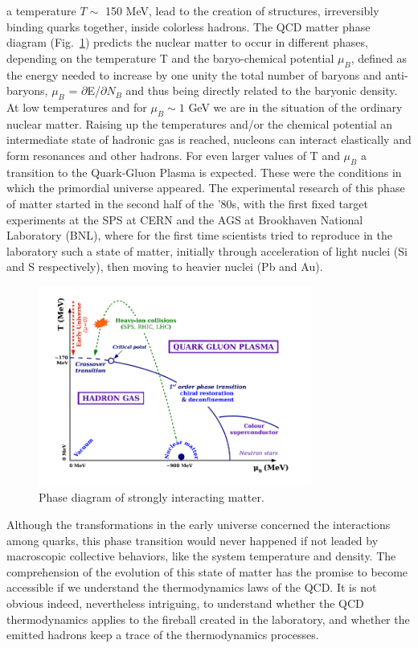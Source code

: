 a temperature $T \sim$ 150 MeV, lead to the 
creation of structures, irreversibly binding quarks together, inside colorless
hadrons. The QCD matter phase diagram (Fig.~\ref{fig:QCDphase}) predicts the nuclear matter to occur in different phases, depending on the temperature T and the baryo-chemical potential $\mu_{B}$, defined as the energy needed to increase by one unity the total number of baryons and anti-baryons, $\mu_{B}$ = $\partial$E/$\partial N_B$ and thus being directly related to the baryonic density. 
At low temperatures and for $\mu_{B} \sim 1$ GeV we are in the situation of the ordinary nuclear matter. Raising up the temperatures and/or the chemical potential an intermediate state of hadronic gas is reached, nucleons can interact elastically and form resonances and other hadrons. For even larger values of T and $\mu_{B}$ a transition to the Quark-Gluon Plasma is expected. These were the conditions in which the primordial universe appeared.
The experimental research of this phase of matter started in the second half of the ’80s, with the first fixed target experiments at the SPS at CERN and the AGS at Brookhaven National Laboratory (BNL), where for the first time scientists tried to reproduce in the laboratory such a state of matter, initially through acceleration of light nuclei (Si and S respectively), then moving to heavier nuclei (Pb and Au).\\


\begin{figure}[h!]
\centering
 \includegraphics[width=0.8\textwidth] {FigCap1/QCDphase.jpeg}
\caption{Phase diagram of strongly interacting matter.}
\label{fig:QCDphase}
\end{figure}

Although the transformations in the early universe concerned the interactions among quarks,
this phase transition would never happened if not leaded by macroscopic
collective behaviors, like the system temperature and density. The comprehension of the evolution of this state of matter 
has the promise to become accessible if we understand the thermodynamics laws of the QCD. It is not obvious indeed, nevertheless intriguing,  to understand whether the QCD thermodynamics applies to the fireball created in the laboratory, and whether the emitted hadrons keep a trace of the thermodynamics processes. \\

